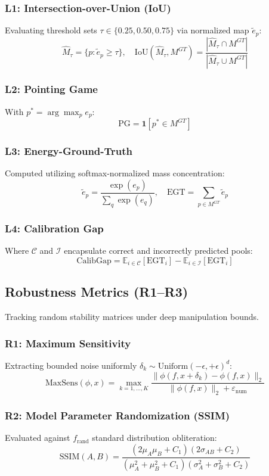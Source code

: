 \documentclass[10pt,journal,compsoc]{IEEEtran}
\begin{document}
\subsubsection{L1: Intersection-over-Union (IoU)}
Evaluating threshold sets $\tau \in \{0.25, 0.50, 0.75\}$ via normalized map $\tilde{e}_p$:
\[
    \hat{M}_\tau = \{p : \tilde{e}_p \geq \tau\}, \quad \text{IoU}(\hat{M}_\tau, M^{GT}) = \frac{|\hat{M}_\tau \cap M^{GT}|}{|\hat{M}_\tau \cup M^{GT}|}
\]

\subsubsection{L2: Pointing Game}
With $p^* = \arg\max_p e_p$:
\[
    \text{PG} = \mathbf{1}\!\left[p^* \in M^{GT}\right]
\]

\subsubsection{L3: Energy-Ground-Truth}
Computed utilizing softmax-normalized mass concentration:
\[
    \tilde{e}_p = \frac{\exp(e_p)}{\sum_{q} \exp(e_q)}, \quad \text{EGT} = \sum_{p \in M^{GT}} \tilde{e}_p
\]

\subsubsection{L4: Calibration Gap}
Where $\mathcal{C}$ and $\mathcal{I}$ encapsulate correct and incorrectly predicted pools:
\[
    \text{CalibGap} = \mathbb{E}_{i \in \mathcal{C}}\!\left[\text{EGT}_i\right] - \mathbb{E}_{i \in \mathcal{I}}\!\left[\text{EGT}_i\right]
\]

\subsection{Robustness Metrics (R1--R3)}
Tracking random stability matrices under deep manipulation bounds.

\subsubsection{R1: Maximum Sensitivity}
Extracting bounded noise uniformly $\delta_k \sim \text{Uniform}(-\epsilon, +\epsilon)^d$:
\[
    \text{MaxSens}(\phi, x) = \max_{k=1,\ldots,K} \frac{\|\phi(f, x+\delta_k) - \phi(f, x)\|_2}{\|\phi(f, x)\|_2 + \varepsilon_\text{num}}
\]

\subsubsection{R2: Model Parameter Randomization (SSIM)}
Evaluated against $f_\text{rand}$ standard distribution obliteration:
\[
    \text{SSIM}(A, B) = \frac{(2\mu_A\mu_B + C_1)(2\sigma_{AB} + C_2)}{(\mu_A^2 + \mu_B^2 + C_1)(\sigma_A^2 + \sigma_B^2 + C_2)}
\]
\end{document}
